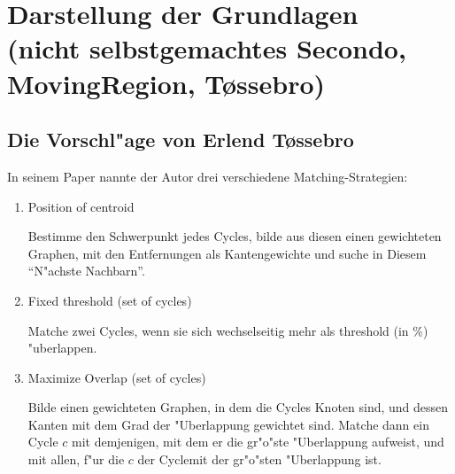 
\chapter[Darstellung der Grundlagen]{Darstellung der Grundlagen\\
\normalsize{(nicht selbstgemachtes
Secondo,
MovingRegion,
T\o{}ssebro)}} \label{Kapitel2}
\minitoc
\newpage
\section{Die Vorschl"age von Erlend T\o{}ssebro}
In seinem Paper nannte der Autor drei verschiedene Matching-Strategien:
\begin{enumerate}
\item Position of centroid

Bestimme den Schwerpunkt jedes Cycles,  bilde aus diesen einen gewichteten Graphen, mit den Entfernungen als Kantengewichte und suche in Diesem "`N"achste Nachbarn"'.
\item Fixed threshold (set of cycles)

Matche zwei Cycles, wenn sie sich wechselseitig  mehr als threshold (in \%) "uberlappen.

\item Maximize Overlap (set of cycles)

Bilde einen gewichteten Graphen, in dem die Cycles Knoten sind, und dessen Kanten mit dem Grad der "Uberlappung gewichtet sind. Matche dann ein Cycle $c$ mit demjenigen, mit dem er die gr"o"ste "Uberlappung aufweist, und mit allen, f"ur die $c$ der Cyclemit der gr"o"sten "Uberlappung ist.
\end{enumerate} 
